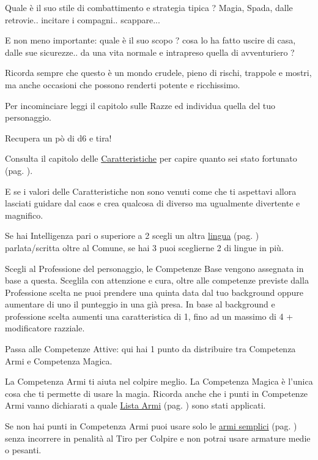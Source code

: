 \begin{multicols}{2}
Quale è il suo stile di combattimento e strategia tipica ? Magia, Spada, dalle retrovie.. incitare i compagni.. scappare...

E non meno importante: quale è il suo scopo ? cosa lo ha fatto uscire di casa, dalle sue sicurezze.. da una vita normale e intrapreso quella di avventuriero ?

Ricorda sempre che questo è un mondo crudele, pieno di rischi, trappole e mostri, ma anche occasioni che possono renderti potente e ricchissimo.

Per incominciare leggi il capitolo sulle Razze ed individua quella del tuo personaggio.

Recupera un pò di d6 e tira!

Consulta il capitolo delle \hyperlink{assegnazione.punteggi.caratteristica}{Caratteristiche} per capire quanto sei stato fortunato (pag. \pageref{assegnazionepunteggicaratteristica}).

E se i valori delle Caratteristiche non sono venuti come che ti aspettavi allora lasciati guidare dal caos e crea qualcosa di diverso ma ugualmente divertente e magnifico.

Se hai Intelligenza pari o superiore a 2 scegli un altra \hyperlink{linguaggi}{lingua} (pag. \pageref{linguaggi}) parlata/scritta oltre al Comune, se hai 3 puoi sceglierne 2 di lingue in più.

Scegli al Professione del personaggio, le Competenze Base vengono assegnata in base a questa. Sceglila con attenzione e cura, oltre alle competenze previste dalla Professione scelta ne puoi prendere una quinta data dal tuo background oppure aumentare di uno il punteggio in una già presa.
In base al background e professione scelta aumenti una caratteristica di 1, fino ad un massimo di 4 + modificatore razziale.

Passa alle Competenze Attive: qui hai 1 punto  da distribuire tra Competenza Armi e Competenza Magica.

La Competenza Armi ti aiuta nel colpire meglio. La Competenza Magica è l'unica cosa che ti permette di usare la magia. Ricorda anche che i punti in Competenze Armi vanno dichiarati a quale \hyperlink{lista.armi}{Lista Armi} (pag. \pageref{lista.armi}) sono stati applicati.

Se non hai punti in Competenza Armi puoi usare solo le \hyperlink{armi.semplici}{armi semplici} (pag. \pageref{listaarmisemplice}) senza incorrere in penalità al Tiro per Colpire e non potrai usare armature medie o pesanti.


\end{multicols}
